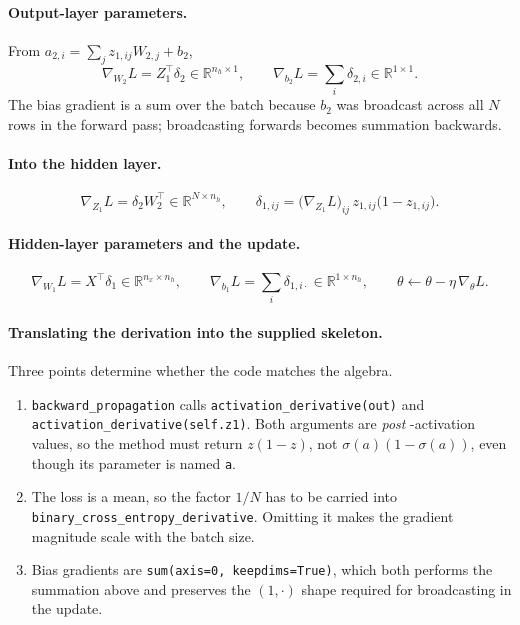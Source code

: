 \documentclass[11pt,a4paper]{article}
\newcommand{\code}[1]{\texttt{#1}}
\begin{document}
\paragraph{Output-layer parameters.} From
$a_{2,i}=\sum_j z_{1,ij}W_{2,j}+b_2$,
\begin{equation}
\nabla_{W_2}L = Z_1^{\top}\delta_2 \in\mathbb{R}^{n_h\times 1},
\qquad
\nabla_{b_2}L = \sum_{i} \delta_{2,i} \in\mathbb{R}^{1\times 1} .
\end{equation}
The bias gradient is a sum over the batch because $b_2$ was broadcast across all $N$
rows in the forward pass; broadcasting forwards becomes summation backwards.

\paragraph{Into the hidden layer.}
\begin{equation}
\nabla_{Z_1}L = \delta_2 W_2^{\top}\in\mathbb{R}^{N\times n_h},
\qquad
\delta_{1,ij} = \big(\nabla_{Z_1}L\big)_{ij}\,
                  z_{1,ij}\big(1-z_{1,ij}\big).
\end{equation}

\paragraph{Hidden-layer parameters and the update.}
\begin{equation}
\nabla_{W_1}L = X^{\top}\delta_1 \in\mathbb{R}^{n_x\times n_h},
\qquad
\nabla_{b_1}L = \sum_i \delta_{1,i\cdot} \in\mathbb{R}^{1\times n_h},
\qquad
\theta \leftarrow \theta - \eta\,\nabla_\theta L .
\end{equation}

\paragraph{Translating the derivation into the supplied skeleton.} Three points
determine whether the code matches the algebra.
\begin{enumerate}[nosep]
  \item \code{backward\_propagation} calls \code{activation\_derivative(out)} and
    \code{activation\_derivative(self.z1)}. Both arguments are \emph{post}
    -activation values, so the method must return $z(1-z)$, not
    $\sigma(a)(1-\sigma(a))$, even though its parameter is named \code{a}.
  \item The loss is a mean, so the factor $1/N$ has to be carried into
    \code{binary\_cross\_entropy\_derivative}. Omitting it makes the gradient
    magnitude scale with the batch size.
  \item Bias gradients are \code{sum(axis=0, keepdims=True)}, which both performs
    the summation above and preserves the $(1,\cdot)$ shape required for
    broadcasting in the update.
\end{enumerate}
\end{document}
